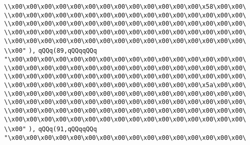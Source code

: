 \verb|\\x00\x00\x00\x00\x00\x00\x00\x00\x00\x00\x00\x00\x00\x58\x00\x00\|\newline
\verb|\\x00\x00\x00\x00\x00\x00\x00\x00\x00\x00\x00\x00\x00\x00\x00\x00\|\newline
\verb|\\x00\x00\x00\x00\x00\x00\x00\x00\x00\x00\x00\x00\x00\x00\x00\x00\|\newline
\verb|\\x00\x00\x00\x00\x00\x00\x00\x00\x00\x00\x00\x00\x00\x00\x00\x00\|\newline
\verb|\\x00\x00\x00\x00\x00\x00\x00\x00\x00\x00\x00\x00\x00\x00\x00\x00\|\newline
\verb|\\x00"|\newline
\verb|),|\newline
\verb|qQQq(89,qQQqqQQq|\newline
\verb|"\x00\x00\x00\x00\x00\x00\x00\x00\x00\x00\x00\x00\x00\x00\x00\x00\|\newline
\verb|\\x00\x00\x00\x00\x00\x00\x00\x00\x00\x00\x00\x00\x00\x00\x00\x00\|\newline
\verb|\\x00\x00\x00\x00\x00\x00\x00\x00\x00\x00\x00\x00\x00\x00\x00\x00\|\newline
\verb|\\x00\x00\x00\x00\x00\x00\x00\x00\x00\x00\x00\x00\x00\x5a\x00\x00\|\newline
\verb|\\x00\x00\x00\x00\x00\x00\x00\x00\x00\x00\x00\x00\x00\x00\x00\x00\|\newline
\verb|\\x00\x00\x00\x00\x00\x00\x00\x00\x00\x00\x00\x00\x00\x00\x00\x00\|\newline
\verb|\\x00\x00\x00\x00\x00\x00\x00\x00\x00\x00\x00\x00\x00\x00\x00\x00\|\newline
\verb|\\x00\x00\x00\x00\x00\x00\x00\x00\x00\x00\x00\x00\x00\x00\x00\x00\|\newline
\verb|\\x00"|\newline
\verb|),|\newline
\verb|qQQq(91,qQQqqQQq|\newline
\verb|"\x00\x00\x00\x00\x00\x00\x00\x00\x00\x00\x00\x00\x00\x00\x00\x00\|\newline
